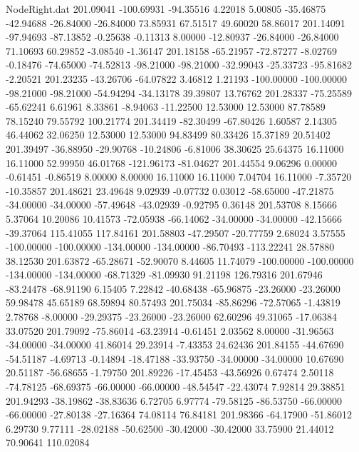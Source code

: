 \begin{filecontents}{NodeRight.dat}
 201.09041 -100.69931  -94.35516     4.22018    5.00805  -35.46875  -42.94688  -26.84000  -26.84000   73.85931   67.51517   49.60020   58.86017
 201.14091  -97.94693  -87.13852    -0.25638   -0.11313    8.00000  -12.80937  -26.84000  -26.84000   71.10693   60.29852   -3.08540   -1.36147
 201.18158  -65.21957  -72.87277    -8.02769   -0.18476  -74.65000  -74.52813  -98.21000  -98.21000  -32.99043  -25.33723  -95.81682   -2.20521
 201.23235  -43.26706  -64.07822     3.46812    1.21193 -100.00000 -100.00000  -98.21000  -98.21000  -54.94294  -34.13178   39.39807   13.76762
 201.28337  -75.25589  -65.62241     6.61961    8.33861   -8.94063  -11.22500   12.53000   12.53000   87.78589   78.15240   79.55792  100.21774
 201.34419  -82.30499  -67.80426     1.60587    2.14305   46.44062   32.06250   12.53000   12.53000   94.83499   80.33426   15.37189   20.51402
 201.39497  -36.88950  -29.90768   -10.24806   -6.81006   38.30625   25.64375   16.11000   16.11000   52.99950   46.01768 -121.96173  -81.04627
 201.44554    9.06296    0.00000    -0.61451   -0.86519    8.00000    8.00000   16.11000   16.11000    7.04704   16.11000   -7.35720  -10.35857
 201.48621   23.49648    9.02939    -0.07732    0.03012  -58.65000  -47.21875  -34.00000  -34.00000  -57.49648  -43.02939   -0.92795    0.36148
 201.53708    8.15666    5.37064    10.20086   10.41573  -72.05938  -66.14062  -34.00000  -34.00000  -42.15666  -39.37064  115.41055  117.84161
 201.58803  -47.29507  -20.77759     2.68024    3.57555 -100.00000 -100.00000 -134.00000 -134.00000  -86.70493 -113.22241   28.57880   38.12530
 201.63872  -65.28671  -52.90070     8.44605   11.74079 -100.00000 -100.00000 -134.00000 -134.00000  -68.71329  -81.09930   91.21198  126.79316
 201.67946  -83.24478  -68.91190     6.15405    7.22842  -40.68438  -65.96875  -23.26000  -23.26000   59.98478   45.65189   68.59894   80.57493
 201.75034  -85.86296  -72.57065    -1.43819    2.78768   -8.00000  -29.29375  -23.26000  -23.26000   62.60296   49.31065  -17.06384   33.07520
 201.79092  -75.86014  -63.23914    -0.61451    2.03562    8.00000  -31.96563  -34.00000  -34.00000   41.86014   29.23914   -7.43353   24.62436
 201.84155  -44.67690  -54.51187    -4.69713   -0.14894  -18.47188  -33.93750  -34.00000  -34.00000   10.67690   20.51187  -56.68655   -1.79750
 201.89226  -17.45453  -43.56926     0.67474    2.50118  -74.78125  -68.69375  -66.00000  -66.00000  -48.54547  -22.43074    7.92814   29.38851
 201.94293  -38.19862  -38.83636     6.72705    6.97774  -79.58125  -86.53750  -66.00000  -66.00000  -27.80138  -27.16364   74.08114   76.84181
 201.98366  -64.17900  -51.86012     6.29730    9.77111  -28.02188  -50.62500  -30.42000  -30.42000   33.75900   21.44012   70.90641  110.02084

\end{filecontents}
